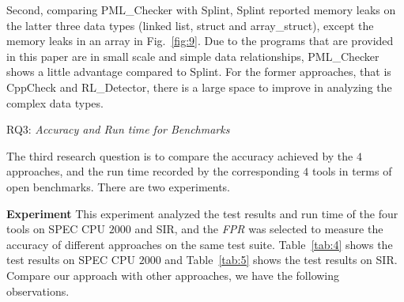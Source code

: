 Second, comparing PML\_Checker with Splint, Splint reported memory leaks on the latter three data types (linked list, struct and array\_struct), except the memory leaks in an array in Fig.~\ref{fig:9}. Due to the programs that are provided in this paper are in small scale and simple data relationships, PML\_Checker shows a little advantage compared to Splint. For the former approaches, that is CppCheck and RL\_Detector, there is a large space to improve in analyzing the complex data types.

\noindent RQ3: \textit{Accuracy and Run time for Benchmarks}

The third research question is to compare the accuracy achieved by the $4$ approaches, and the run time recorded by the corresponding $4$ tools in terms of open benchmarks. There are two experiments.

\noindent\textbf{Experiment } This experiment analyzed the test results and run time of the four tools on SPEC CPU $2000$ and SIR, and the \textit{FPR} was selected to measure the accuracy of different approaches on the same test suite. Table~\ref{tab:4} shows the test results on SPEC CPU $2000$ and Table~\ref{tab:5} shows the test results on SIR. Compare our approach with other approaches, we have the following observations. 


